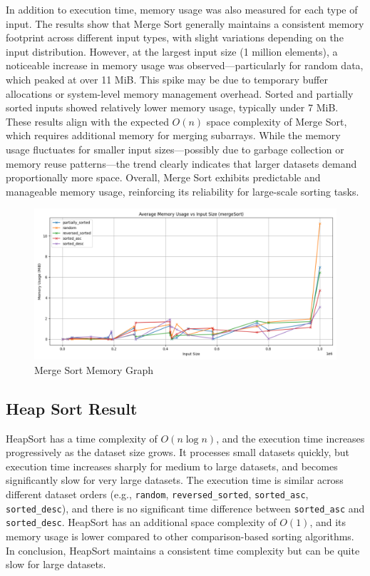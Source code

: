 \documentclass[sigconf]{acmart}
\begin{document}
In addition to execution time, memory usage was also measured for each type of input. The results show that Merge Sort generally maintains a consistent memory footprint across different input types, with slight variations depending on the input distribution. However, at the largest input size (1 million elements), a noticeable increase in memory usage was observed—particularly for random data, which peaked at over 11 MiB. This spike may be due to temporary buffer allocations or system-level memory management overhead. Sorted and partially sorted inputs showed relatively lower memory usage, typically under 7 MiB. These results align with the expected $O(n)$ space complexity of Merge Sort, which requires additional memory for merging subarrays. While the memory usage fluctuates for smaller input sizes—possibly due to garbage collection or memory reuse patterns—the trend clearly indicates that larger datasets demand proportionally more space. Overall, Merge Sort exhibits predictable and manageable memory usage, reinforcing its reliability for large-scale sorting tasks.


\begin{figure}[H]
\centering
\includegraphics[width=0.85\linewidth]{figures/mergeMem.pdf}
\vspace{-0.3cm}
\caption{Merge Sort Memory Graph}  
\vspace{-0.35cm}
\label{fig:proportion}
\end{figure}

\subsection{Heap Sort Result}

HeapSort has a time complexity of $O(n \log n)$, and the execution time increases progressively as the dataset size grows. It processes small datasets quickly, but execution time increases sharply for medium to large datasets, and becomes significantly slow for very large datasets. The execution time is similar across different dataset orders (e.g., \texttt{random}, \texttt{reversed\_sorted}, \texttt{sorted\_asc}, \texttt{sorted\_desc}), and there is no significant time difference between \texttt{sorted\_asc} and \texttt{sorted\_desc}. HeapSort has an additional space complexity of $O(1)$, and its memory usage is lower compared to other comparison-based sorting algorithms. In conclusion, HeapSort maintains a consistent time complexity but can be quite slow for large datasets.
\end{document}
